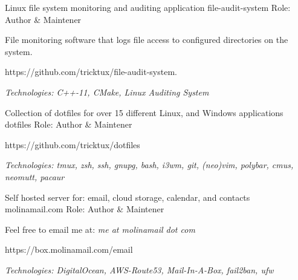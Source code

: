 

\begin{cventries}
  \cventry
  {Linux file system monitoring and auditing application} %
  {file-audit-system} %
  {} %
  {Role: Author \& Maintener} %
  {
    \begin{cvitems} %
    \item {File monitoring software that logs file access to configured directories on the system.}
    \item {https://github.com/tricktux/file-audit-system.}
    \item {\it{Technologies:} C++-11, CMake, Linux Auditing System}
    \end{cvitems}
  }

  \cventry
		{Collection of dotfiles for over 15 different Linux, and Windows applications} %
    {dotfiles} %
    {} %
		{Role: Author \& Maintener} %
    {
      \begin{cvitems} %
				\item {https://github.com/tricktux/dotfiles}
				\item {\it{Technologies:} tmux, zsh, ssh, gnupg, bash, i3wm, git, (neo)vim, polybar, cmus, neomutt, pacaur}
      \end{cvitems}
    }

    \cventry
      {Self hosted server for: email, cloud storage, calendar, and contacts} %
      {molinamail.com} %
      {} %
      {Role: Author \& Maintener} %
      {
        \begin{cvitems} %
        \item {Feel free to email me at: \it{me at molinamail dot com}}
        \item {https://box.molinamail.com/email}
        \item {\it{Technologies:} DigitalOcean, AWS-Route53, Mail-In-A-Box, fail2ban, ufw }
        \end{cvitems}
      }

\end{cventries}

